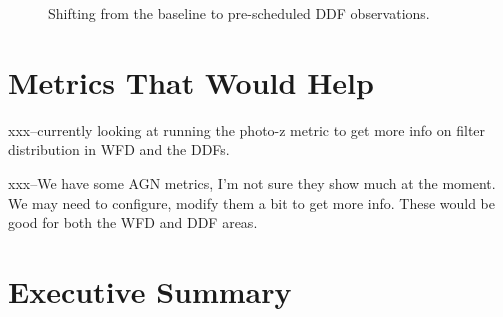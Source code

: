\begin{figure}
\caption{Shifting from the baseline to pre-scheduled DDF observations.}
\end{figure}

\section{Metrics That Would Help}

xxx--currently looking at running the photo-z metric to get more info on filter distribution in WFD and the DDFs.

xxx--We have some AGN metrics, I'm not sure they show much at the moment. We may need to configure, modify them a bit to get more info. These would be good for both the WFD and DDF areas. 


\section{Executive Summary}


